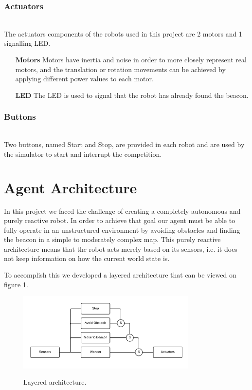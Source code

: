\documentclass[oribibl]{llncs}
\begin{document}
\subsubsection{Actuators}\hfill \\
The actuators components of the robots used in this project are 2 motors and 1 signalling LED. 
\begin{itemize}
  \item[\textbf{Motors}]
Motors have inertia and noise in order to more closely represent real motors, and the translation or rotation movements can be achieved by applying different power values to each motor.
  \item[\textbf{LED}]
The LED is used to signal that the robot has already found the beacon.
\end{itemize}

\subsubsection{Buttons}\hfill \\
Two buttons, named Start and Stop, are provided in each robot and are used by the simulator to start and interrupt the competition.

\section{Agent Architecture}
In this project we faced the challenge of creating a completely autonomous and purely reactive robot. In order to achieve that goal our agent must be able to fully operate in an unstructured environment by avoiding obstacles and finding the beacon in a simple to moderately complex map.
This purely reactive architecture means that the robot acts merely based on its sensors, i.e. it does not keep information on how the current world state is.

To accomplish this we developed a layered architecture that can be viewed on figure 1.

\begin{figure}
  \centering
  \includegraphics[width=0.8\textwidth]{layer-architecture}
  \label{fig:layered}
  \caption{Layered architecture.}
\end{figure}
\end{document}
